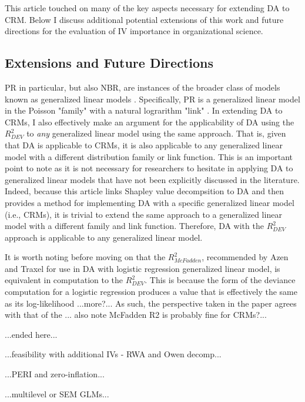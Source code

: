 \documentclass[ShortAfour,times,sageapa]{sagej}
\begin{document}
	This article touched on many of the key aspects necessary for extending DA to CRM.
	Below I discuss additional potential extensions of this work and future directions for the evaluation of IV importance in organizational science.
	
	\subsection{Extensions and Future Directions}
	
	PR in particular, but also NBR, are instances of the broader class of models known as generalized linear models \cite{mccullagh2019generalized}. 
	Specifically, PR is a generalized linear model in the Poisson "family" with a natural lograrithm "link" \cite[See implementation of generalized linear models in the R software;]{R}.
	In extending DA to CRMs, I also effectively make an argument for the applicability of DA using the $R^2_{DEV}$ to \emph{any} generalized linear model using the same approach.
	That is, given that DA is applicable to CRMs, it is also applicable to any generalized linear model with a different distribution family or link function.
	This is an important point to note as it is not necessary for researchers to hesitate in applying DA to generalized linear models that have not been explicitly discussed in the literature.
	Indeed, because this article links Shapley value decompsition to DA and then provides a method for implementing DA with a specific generalized linear model (i.e., CRMs), it is trivial to extend the same approach to a generalized linear model with a different family and link function.
	Therefore, DA with the $R^2_{DEV}$ approach is applicable to any generalized linear model.
	
	It is worth noting before moving on that the $R^2_{McFadden}$, recommended by Azen and Traxel \cite{azen2009using} for use in DA with logistic regression generalized linear model, is equivalent in computation to the $R^2_{DEV}$. 
	This is because the form of the deviance computation for a logistic regression produces a value that is effectively the same as its log-likelihood
	...more?...
	As such, the perspective taken in the paper agrees with that of the 
	... also note McFadden R2 is probably fine for CRMs?... 
	
	...ended here...
	
	...feasibility with additional IVs - RWA and Owen decomp...
	
	...PERI and zero-inflation...
	
	...multilevel or SEM GLMs...
	
\end{document}
